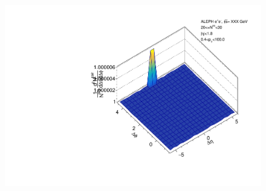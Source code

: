\begin{figure}[htbp]
\begin{minipage}[b]{0.32\linewidth}
  \end{minipage}
  \begin{minipage}[b]{0.32\linewidth}
    \centering
    \includegraphics[width=\linewidth]{images/TwoParticleCorrelation/LEP2_THRUST/LEP2_THRUST_r_ratio_20_30.pdf}
    \label{fig:LEP2 Thrust Axis, Ratio Plot, Multiplicity 20-30, Ratio}
  \end{minipage}
\end{figure}


